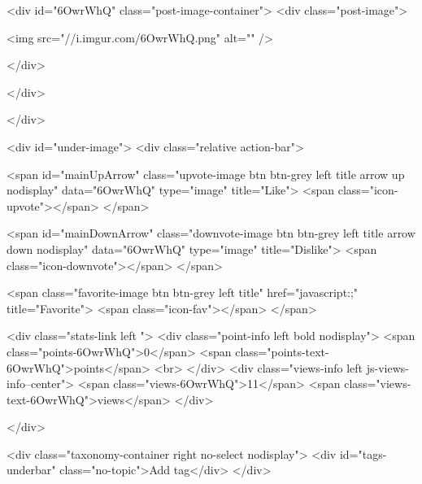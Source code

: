                     
                    

                    <div id="6OwrWhQ" class="post-image-container">
                        <div class="post-image">
    

            
        
        <img src="//i.imgur.com/6OwrWhQ.png" alt="" />
        
        
    
</div>

                        
                        
                    </div>
                

                

                
                </div>

                <div id="under-image">
                    <div class="relative action-bar">

    <span id="mainUpArrow" class="upvote-image btn btn-grey left title arrow up nodisplay" data="6OwrWhQ" type="image" title="Like">
        <span class="icon-upvote"></span>
    </span>

    <span id="mainDownArrow" class="downvote-image btn btn-grey left title arrow down nodisplay" data="6OwrWhQ" type="image" title="Dislike">
        <span class="icon-downvote"></span>
    </span>

    <span class="favorite-image btn btn-grey left title" href="javascript:;" title="Favorite">
        <span class="icon-fav"></span>
    </span>

    <div class="stats-link left ">
                    <div class="point-info left bold nodisplay">
                <span class="points-6OwrWhQ">0</span>
                <span class="points-text-6OwrWhQ">points</span>
                <br>
            </div>
            <div class="views-info left js-views-info--center">
                <span class="views-6OwrWhQ">11</span>
                <span class="views-text-6OwrWhQ">views</span>
            </div>
        

        
                    
        

    </div>

    <div class="taxonomy-container right no-select nodisplay">
        <div id="tags-underbar" class="no-topic">Add tag</div>
    </div>

